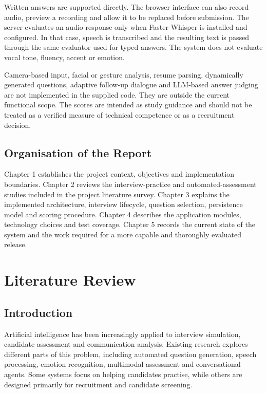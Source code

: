\documentclass[12pt,a4paper,oneside]{report}
\begin{document}
Written answers are supported directly. The browser interface can also record audio, preview a recording and allow it to be replaced before submission. The server evaluates an audio response only when Faster-Whisper is installed and configured. In that case, speech is transcribed and the resulting text is passed through the same evaluator used for typed answers. The system does not evaluate vocal tone, fluency, accent or emotion.

Camera-based input, facial or gesture analysis, resume parsing, dynamically generated questions, adaptive follow-up dialogue and LLM-based answer judging are not implemented in the supplied code. They are outside the current functional scope. The scores are intended as study guidance and should not be treated as a verified measure of technical competence or as a recruitment decision.

\section{Organisation of the Report}
Chapter 1 establishes the project context, objectives and implementation boundaries. Chapter 2 reviews the interview-practice and automated-assessment studies included in the project literature survey. Chapter 3 explains the implemented architecture, interview lifecycle, question selection, persistence model and scoring procedure. Chapter 4 describes the application modules, technology choices and test coverage. Chapter 5 records the current state of the system and the work required for a more capable and thoroughly evaluated release.

\chapter{Literature Review}

\section{Introduction}
Artificial intelligence has been increasingly applied to interview simulation, candidate assessment and communication analysis. Existing research explores different parts of this problem, including automated question generation, speech processing, emotion recognition, multimodal assessment and conversational agents. Some systems focus on helping candidates practise, while others are designed primarily for recruitment and candidate screening.
\end{document}

